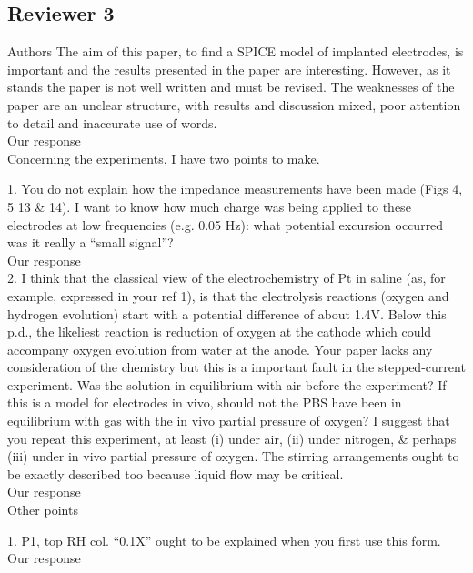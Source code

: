 \documentclass[journal, a4paper]{IEEEtran}
\begin{document}
\subsection*{Reviewer 3}

{\color{blue}
Authors
The aim of this paper, to find a SPICE model of implanted electrodes, is important and the results presented in the paper are interesting. However, as it stands the paper is not well written and must be revised. The weaknesses of the paper are an unclear structure, with results and discussion mixed, poor attention to detail and inaccurate use of words.\\
{\color{OliveGreen} Our response}\\

Concerning the experiments, I have two points to make.

1. You do not explain how the impedance measurements have been made (Figs 4, 5 13 & 14). I want to know how much charge was being applied to these electrodes at low frequencies (e.g. 0.05 Hz): what potential excursion occurred was it really a ``small signal''?\\
{\color{OliveGreen} Our response}\\

2. I think that the classical view of the electrochemistry of Pt in saline (as, for example, expressed in your ref 1), is that the electrolysis reactions (oxygen and hydrogen evolution) start with a potential difference of about 1.4V. Below this p.d., the likeliest reaction is reduction of oxygen at the cathode which could accompany oxygen evolution from water at the anode. Your paper lacks any consideration of the chemistry but this is a important fault in the stepped-current experiment. Was the solution in equilibrium with air before the experiment? If this is a model for electrodes in vivo, should not the PBS have been in equilibrium with gas with the in vivo partial pressure of oxygen? I suggest that you repeat this experiment, at least (i) under air, (ii) under nitrogen, & perhaps (iii) under in vivo partial pressure of oxygen. The stirring arrangements ought to be exactly described too because liquid flow may be critical.\\
{\color{OliveGreen} Our response}\\

Other points

1. P1, top RH col. ``0.1X'' ought to be explained when you first use this form.\\
{\color{OliveGreen} Our response}\\

}
\end{document}
